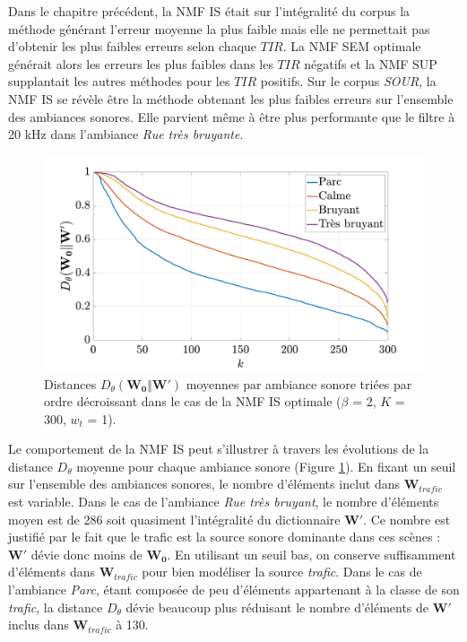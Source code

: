 Dans le chapitre précédent, la NMF IS était sur l'intégralité du corpus la méthode générant l'erreur moyenne la plus faible mais elle ne permettait pas d'obtenir les plus faibles erreurs selon chaque $TIR$. La NMF SEM optimale générait alors les erreurs les plus faibles dans les $TIR$ négatifs et la NMF SUP supplantait les autres méthodes pour les $TIR$ positifs. 
Sur le corpus \textit{SOUR}, la NMF IS se révèle être la méthode obtenant les plus faibles erreurs sur l'ensemble des ambiances sonores. Elle parvient même à être plus performante que le filtre à 20 kHz dans l'ambiance \textit{Rue très bruyante}. 

\begin{figure}[h]
\centering
\includegraphics[width=.7\linewidth]{./figures/resultats/dist_grafic.pdf}
\caption{Distances $D_{\theta}(\mathbf{W_0}\Vert \mathbf{W'})$ moyennes par ambiance sonore triées par ordre décroissant  dans le cas de la NMF IS optimale ($\beta$ = 2, $K$ = 300, $w_t$ = 1).}
\label{fig:dist_grafic}
\end{figure}

Le comportement de la NMF IS peut s'illustrer à travers les évolutions de la distance $D_{\theta}$ moyenne pour chaque ambiance sonore (Figure \ref{fig:dist_grafic}).
En fixant un seuil sur l'ensemble des ambiances sonores, le nombre d'éléments inclut dans $\mathbf{W}_{trafic}$ est variable. 
Dans le cas de l'ambiance \textit{Rue très bruyant}, le nombre d'éléments moyen est de 286 soit quasiment l'intégralité du dictionnaire $\mathbf{W'}$. Ce nombre est justifié par le fait que le trafic est la source sonore dominante dans ces scènes : $\mathbf{W'}$ dévie donc moins de $\mathbf{W_0}$. En utilisant un seuil bas, on conserve suffisamment d'éléments dans $\mathbf{W}_{trafic}$ pour bien modéliser la source \textit{trafic}.
Dans le cas de l'ambiance \textit{Parc}, étant composée de peu d'éléments appartenant à la classe de son \textit{trafic}, la distance $D_{\theta}$ dévie beaucoup plus réduisant le nombre d'éléments de $\mathbf{W'}$ inclus dans $\mathbf{W}_{trafic}$ à 130.


